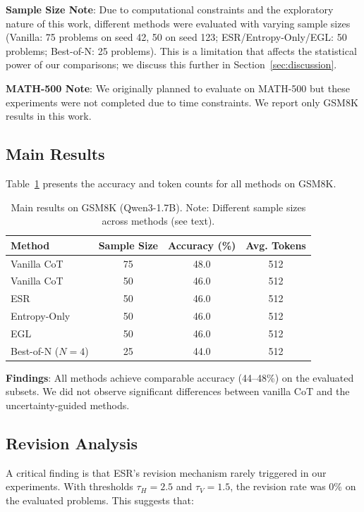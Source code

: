 \documentclass{article}
\begin{document}
\textbf{Sample Size Note}: Due to computational constraints and the exploratory nature of this work, different methods were evaluated with varying sample sizes (Vanilla: 75 problems on seed 42, 50 on seed 123; ESR/Entropy-Only/EGL: 50 problems; Best-of-N: 25 problems). This is a limitation that affects the statistical power of our comparisons; we discuss this further in Section~\ref{sec:discussion}.

\textbf{MATH-500 Note}: We originally planned to evaluate on MATH-500 \citep{lightman2023let} but these experiments were not completed due to time constraints. We report only GSM8K results in this work.

\subsection{Main Results}

Table~\ref{tab:main_results} presents the accuracy and token counts for all methods on GSM8K.

\begin{table}[t]
\caption{Main results on GSM8K (Qwen3-1.7B). Note: Different sample sizes across methods (see text).}
\label{tab:main_results}
\centering
\begin{tabular}{lccc}
\toprule
Method & Sample Size & Accuracy (\%) & Avg. Tokens \\
\midrule
Vanilla CoT & 75 & 48.0 & 512 \\
Vanilla CoT & 50 & 46.0 & 512 \\
ESR & 50 & 46.0 & 512 \\
Entropy-Only & 50 & 46.0 & 512 \\
EGL & 50 & 46.0 & 512 \\
Best-of-N ($N=4$) & 25 & 44.0 & 512 \\
\bottomrule
\end{tabular}
\end{table}

\textbf{Findings}: All methods achieve comparable accuracy (44--48\%) on the evaluated subsets. We did not observe significant differences between vanilla CoT and the uncertainty-guided methods.

\subsection{Revision Analysis}

A critical finding is that ESR's revision mechanism rarely triggered in our experiments. With thresholds $\tau_H=2.5$ and $\tau_V=1.5$, the revision rate was 0\% on the evaluated problems. This suggests that:
\end{document}
